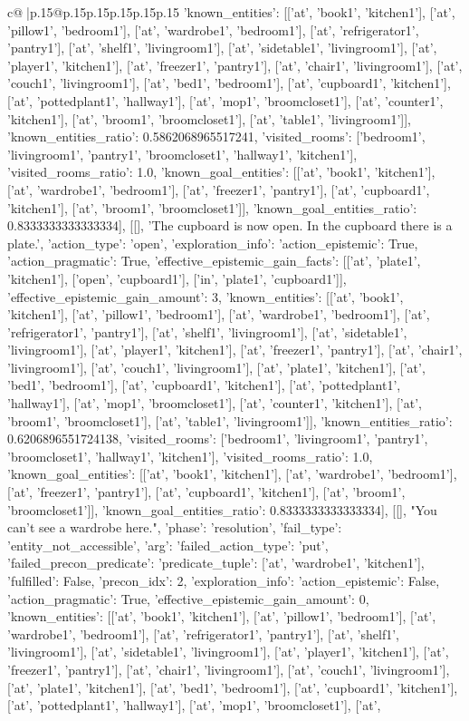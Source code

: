 \documentclass{article}
\begin{document}
{\begin{supertabular}{c@{$\;$}|p{.15\linewidth}@{}p{.15\linewidth}p{.15\linewidth}p{.15\linewidth}p{.15\linewidth}p{.15\linewidth}}
{{{'known_entities': [['at', 'book1', 'kitchen1'], ['at', 'pillow1', 'bedroom1'], ['at', 'wardrobe1', 'bedroom1'], ['at', 'refrigerator1', 'pantry1'], ['at', 'shelf1', 'livingroom1'], ['at', 'sidetable1', 'livingroom1'], ['at', 'player1', 'kitchen1'], ['at', 'freezer1', 'pantry1'], ['at', 'chair1', 'livingroom1'], ['at', 'couch1', 'livingroom1'], ['at', 'bed1', 'bedroom1'], ['at', 'cupboard1', 'kitchen1'], ['at', 'pottedplant1', 'hallway1'], ['at', 'mop1', 'broomcloset1'], ['at', 'counter1', 'kitchen1'], ['at', 'broom1', 'broomcloset1'], ['at', 'table1', 'livingroom1']], 'known_entities_ratio': 0.5862068965517241, 'visited_rooms': ['bedroom1', 'livingroom1', 'pantry1', 'broomcloset1', 'hallway1', 'kitchen1'], 'visited_rooms_ratio': 1.0, 'known_goal_entities': [['at', 'book1', 'kitchen1'], ['at', 'wardrobe1', 'bedroom1'], ['at', 'freezer1', 'pantry1'], ['at', 'cupboard1', 'kitchen1'], ['at', 'broom1', 'broomcloset1']], 'known_goal_entities_ratio': 0.8333333333333334}}], [[], 'The cupboard is now open. In the cupboard there is a plate.', {'action_type': 'open', 'exploration_info': {'action_epistemic': True, 'action_pragmatic': True, 'effective_epistemic_gain_facts': [['at', 'plate1', 'kitchen1'], ['open', 'cupboard1'], ['in', 'plate1', 'cupboard1']], 'effective_epistemic_gain_amount': 3, 'known_entities': [['at', 'book1', 'kitchen1'], ['at', 'pillow1', 'bedroom1'], ['at', 'wardrobe1', 'bedroom1'], ['at', 'refrigerator1', 'pantry1'], ['at', 'shelf1', 'livingroom1'], ['at', 'sidetable1', 'livingroom1'], ['at', 'player1', 'kitchen1'], ['at', 'freezer1', 'pantry1'], ['at', 'chair1', 'livingroom1'], ['at', 'couch1', 'livingroom1'], ['at', 'plate1', 'kitchen1'], ['at', 'bed1', 'bedroom1'], ['at', 'cupboard1', 'kitchen1'], ['at', 'pottedplant1', 'hallway1'], ['at', 'mop1', 'broomcloset1'], ['at', 'counter1', 'kitchen1'], ['at', 'broom1', 'broomcloset1'], ['at', 'table1', 'livingroom1']], 'known_entities_ratio': 0.6206896551724138, 'visited_rooms': ['bedroom1', 'livingroom1', 'pantry1', 'broomcloset1', 'hallway1', 'kitchen1'], 'visited_rooms_ratio': 1.0, 'known_goal_entities': [['at', 'book1', 'kitchen1'], ['at', 'wardrobe1', 'bedroom1'], ['at', 'freezer1', 'pantry1'], ['at', 'cupboard1', 'kitchen1'], ['at', 'broom1', 'broomcloset1']], 'known_goal_entities_ratio': 0.8333333333333334}}], [[], "You can't see a wardrobe here.", {'phase': 'resolution', 'fail_type': 'entity_not_accessible', 'arg': {'failed_action_type': 'put', 'failed_precon_predicate': {'predicate_tuple': ['at', 'wardrobe1', 'kitchen1'], 'fulfilled': False, 'precon_idx': 2}}, 'exploration_info': {'action_epistemic': False, 'action_pragmatic': True, 'effective_epistemic_gain_amount': 0, 'known_entities': [['at', 'book1', 'kitchen1'], ['at', 'pillow1', 'bedroom1'], ['at', 'wardrobe1', 'bedroom1'], ['at', 'refrigerator1', 'pantry1'], ['at', 'shelf1', 'livingroom1'], ['at', 'sidetable1', 'livingroom1'], ['at', 'player1', 'kitchen1'], ['at', 'freezer1', 'pantry1'], ['at', 'chair1', 'livingroom1'], ['at', 'couch1', 'livingroom1'], ['at', 'plate1', 'kitchen1'], ['at', 'bed1', 'bedroom1'], ['at', 'cupboard1', 'kitchen1'], ['at', 'pottedplant1', 'hallway1'], ['at', 'mop1', 'broomcloset1'], ['at', }}}
\end{supertabular}}
\end{document}
